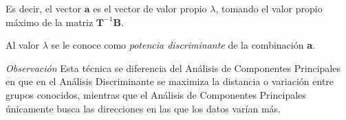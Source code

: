 Es decir, el vector $\textbf{a}$ es el vector de valor propio $\lambda$, tomando el valor propio máximo de la matriz $\textbf{T}^{-1}\textbf{B}$.

\begin{defi}
Al valor $\lambda$ se le conoce como \textit{potencia discriminante} de la combinación \textbf{a}.
\end{defi}

\noindent  

\noindent \textit{Observación} Esta técnica se diferencia del Análisis de Componentes Principales en que en el Análisis Discriminante se maximiza la distancia o variación entre grupos conocidos, mientras que el Análisis de Componentes Principales únicamente busca las direcciones en las que los datos varían más. 




